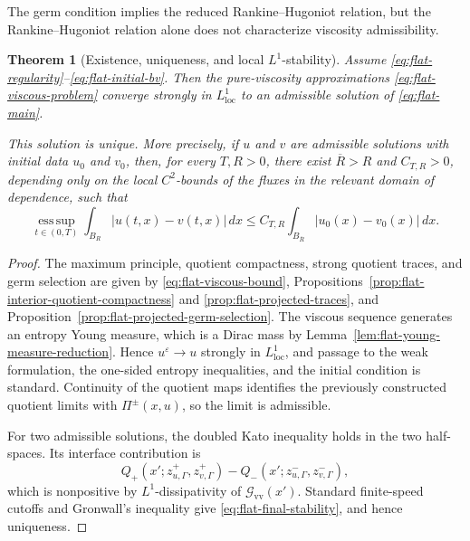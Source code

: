 \documentclass[11pt]{amsart}
\numberwithin{equation}{section}
\theoremstyle{plain}
\newtheorem{theorem}{Theorem}[section]
\theoremstyle{definition}
\theoremstyle{remark}
\begin{document}
The germ condition implies the reduced Rankine--Hugoniot relation, but the
Rankine--Hugoniot relation alone does not characterize viscosity
admissibility.

\begin{theorem}[Existence, uniqueness, and local \(L^1\)-stability]
\label{thm:flat-wellposedness}
Assume \eqref{eq:flat-regularity}--\eqref{eq:flat-initial-bv}. Then the
pure-viscosity approximations \eqref{eq:flat-viscous-problem} converge
strongly in \(L^1_{\mathrm{loc}}\) to an admissible solution of
\eqref{eq:flat-main}.

This solution is unique. More precisely, if \(u\) and \(v\) are admissible
solutions with initial data \(u_0\) and \(v_0\), then, for every \(T,R>0\),
there exist \(\overline R>R\) and \(C_{T,R}>0\), depending only on the local
\(C^2\)-bounds of the fluxes in the relevant domain of dependence, such that
\begin{equation}
\label{eq:flat-final-stability}
    \operatorname*{ess\,sup}_{t\in(0,T)}
    \int_{B_R}|u(t,x)-v(t,x)|\,dx
    \leq
    C_{T,R}
    \int_{B_{\overline R}}|u_0(x)-v_0(x)|\,dx.
\end{equation}
\end{theorem}

\begin{proof}
The maximum principle, quotient compactness, strong quotient traces, and germ
selection are given by
\eqref{eq:flat-viscous-bound},
Propositions~\ref{prop:flat-interior-quotient-compactness} and
\ref{prop:flat-projected-traces}, and
Proposition~\ref{prop:flat-projected-germ-selection}. The viscous sequence
generates an entropy Young measure, which is a Dirac mass by
Lemma~\ref{lem:flat-young-measure-reduction}. Hence
\(u^\varepsilon\to u\) strongly in \(L^1_{\mathrm{loc}}\), and passage to
the weak formulation, the one-sided entropy inequalities, and the initial
condition is standard. Continuity of the quotient maps identifies the
previously constructed quotient limits with \(\Pi^\pm(x,u)\), so the limit
is admissible.

For two admissible solutions, the doubled Kato inequality holds in the two
half-spaces. Its interface contribution is
\[
    Q_+(x';z^+_{u,\Gamma},z^+_{v,\Gamma})
    -
    Q_-(x';z^-_{u,\Gamma},z^-_{v,\Gamma}),
\]
which is nonpositive by \(L^1\)-dissipativity of
\(\mathcal G_{\mathrm{vv}}(x')\). Standard finite-speed cutoffs and
Gronwall's inequality give \eqref{eq:flat-final-stability}, and hence
uniqueness.
\end{proof}
\end{document}
